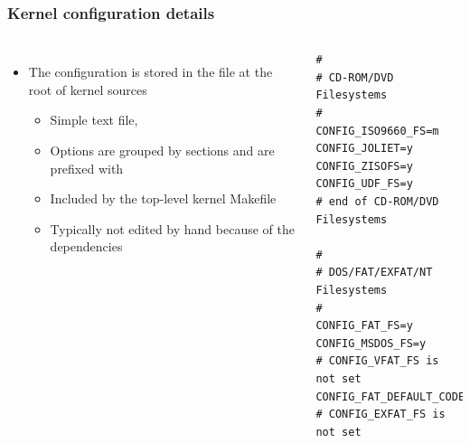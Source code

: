 \begin{frame}[fragile]
  \frametitle{Kernel configuration details}
  \begin{columns}
    \begin{itemize}
    \item The configuration is stored in the  file at the
      root of kernel sources
      \begin{itemize}
      \item Simple text file, 
      \item Options are grouped by sections and are prefixed with
      \item Included by the top-level kernel Makefile
      \item Typically not edited by hand because of the dependencies
      \end{itemize}
    \end{itemize}
    \footnotesize
\begin{verbatim}
#
# CD-ROM/DVD Filesystems
#
CONFIG_ISO9660_FS=m
CONFIG_JOLIET=y
CONFIG_ZISOFS=y
CONFIG_UDF_FS=y
# end of CD-ROM/DVD Filesystems

#
# DOS/FAT/EXFAT/NT Filesystems
#
CONFIG_FAT_FS=y
CONFIG_MSDOS_FS=y
# CONFIG_VFAT_FS is not set
CONFIG_FAT_DEFAULT_CODEPAGE=437
# CONFIG_EXFAT_FS is not set
\end{verbatim}
  \end{columns}
\end{frame}

